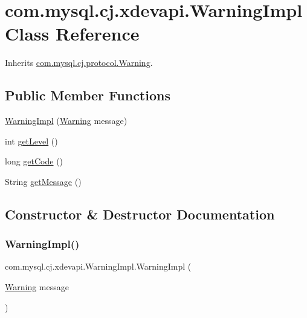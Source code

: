 \hypertarget{classcom_1_1mysql_1_1cj_1_1xdevapi_1_1_warning_impl}{}\section{com.\+mysql.\+cj.\+xdevapi.\+Warning\+Impl Class Reference}
\label{classcom_1_1mysql_1_1cj_1_1xdevapi_1_1_warning_impl}


Inherits \mbox{\hyperlink{interfacecom_1_1mysql_1_1cj_1_1protocol_1_1_warning}{com.\+mysql.\+cj.\+protocol.\+Warning}}.

\subsection*{Public Member Functions}
\begin{DoxyCompactItemize}
\item 
\mbox{\hyperlink{classcom_1_1mysql_1_1cj_1_1xdevapi_1_1_warning_impl_ab29b3bf7a858f1b4f6f0a5b1acb4ca8a}{Warning\+Impl}} (\mbox{\hyperlink{interfacecom_1_1mysql_1_1cj_1_1protocol_1_1_warning}{Warning}} message)
\item 
int \mbox{\hyperlink{classcom_1_1mysql_1_1cj_1_1xdevapi_1_1_warning_impl_abc0fcf3e60763b3d3ce1b7126be22f61}{get\+Level}} ()
\item 
long \mbox{\hyperlink{classcom_1_1mysql_1_1cj_1_1xdevapi_1_1_warning_impl_a4e36aba92d49db5855897c8a26ffce06}{get\+Code}} ()
\item 
String \mbox{\hyperlink{classcom_1_1mysql_1_1cj_1_1xdevapi_1_1_warning_impl_afeeda25bc13726f35b4198262c46f605}{get\+Message}} ()
\end{DoxyCompactItemize}


\subsection{Constructor \& Destructor Documentation}
\mbox{\label{classcom_1_1mysql_1_1cj_1_1xdevapi_1_1_warning_impl_ab29b3bf7a858f1b4f6f0a5b1acb4ca8a}} 
\subsubsection{\texorpdfstring{Warning\+Impl()}{WarningImpl()}}
{\footnotesize\ttfamily com.\+mysql.\+cj.\+xdevapi.\+Warning\+Impl.\+Warning\+Impl (\begin{DoxyParamCaption}\item[{\mbox{\hyperlink{interfacecom_1_1mysql_1_1cj_1_1protocol_1_1_warning}{Warning}}}]{message }\end{DoxyParamCaption})}




